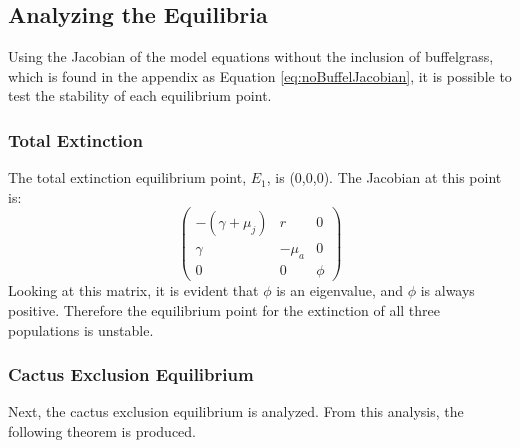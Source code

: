 \documentclass[a4paper]{article}
\begin{document}

\subsection{Analyzing the Equilibria}
Using the Jacobian of the model equations without the inclusion of buffelgrass, which is found in the appendix as Equation \ref{eq:noBuffelJacobian}, it is possible to test the stability of each equilibrium point. 

\subsubsection{Total Extinction}
The total extinction equilibrium point, $E_1$, is (0,0,0).
The Jacobian at this point is:
$$ \begin{pmatrix}
-(\gamma +\mu_j) & r & 0\\
\gamma & -\mu_a & 0\\
0 & 0 & \phi
\end{pmatrix}$$
Looking at this matrix, it is evident that $\phi$ is an eigenvalue, and $\phi$ is always positive. Therefore the equilibrium point for the extinction of all three populations is unstable.

\subsubsection{Cactus Exclusion Equilibrium}
Next, the cactus exclusion equilibrium is analyzed. From this analysis, the following theorem is produced.
\end{document}
